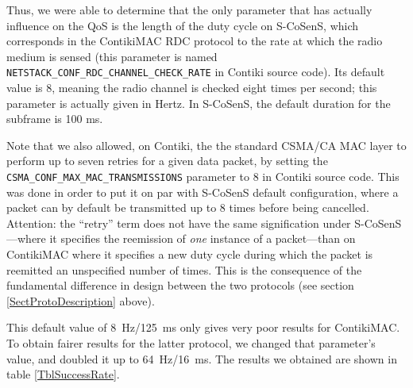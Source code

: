 \documentclass[a4paper,twoside]{article}
\begin{document}
Thus, we were able to determine that the only parameter that has actually
influence on the QoS is the length of the duty cycle on S-CoSenS, which
corresponds in the ContikiMAC RDC protocol to the rate at which the radio
medium is sensed (this parameter is named
\texttt{NETSTACK\_CONF\_RDC\_CHANNEL\_CHECK\_RATE} in Contiki source code).
Its default value is 8, meaning the radio channel is checked eight times
per second; this parameter is actually given in Hertz.
In S-CoSenS, the default duration for the subframe is 100 ms.

Note that we also allowed, on Contiki, the the standard CSMA/CA MAC layer
to perform up to seven retries for a given data packet, by setting the
\texttt{CSMA\_CONF\_MAX\_MAC\_TRANSMISSIONS}
parameter to 8 in Contiki source code. This was done in order to put it
on par with S-CoSenS default configuration, where a packet can by default
be transmitted up to 8 times before being cancelled.
Attention: the ``retry'' term does not have the same signification
under S-CoSenS---where it specifies the reemission of \emph{one} instance of
a packet---than on ContikiMAC where it specifies a new duty cycle during
which the packet is reemitted an unspecified number of times. This is
the consequence of the fundamental difference in design between the two
protocols (see section \ref{SectProtoDescription} above).

This default value of 8~Hz/125~ms only gives very poor results for ContikiMAC.
To obtain fairer results for the latter protocol, we changed that parameter's
value, and doubled it up to 64~Hz/16~ms.
The results we obtained are shown in table \ref{TblSuccessRate}.
\end{document}
